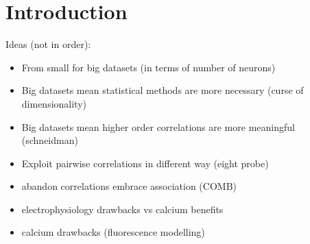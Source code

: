 \section{Introduction}
Ideas (not in order):
\begin{itemize}
    \item From small for big datasets (in terms of number of neurons)
    \item Big datasets mean statistical methods are more necessary (curse of dimensionality)
    \item Big datasets mean higher order correlations are more meaningful (schneidman)
    \item Exploit pairwise correlations in different way (eight probe)
    \item abandon correlations embrace association (COMB)
    \item electrophysiology drawbacks vs calcium benefits
    \item calcium drawbacks (fluorescence modelling)
\end{itemize}
